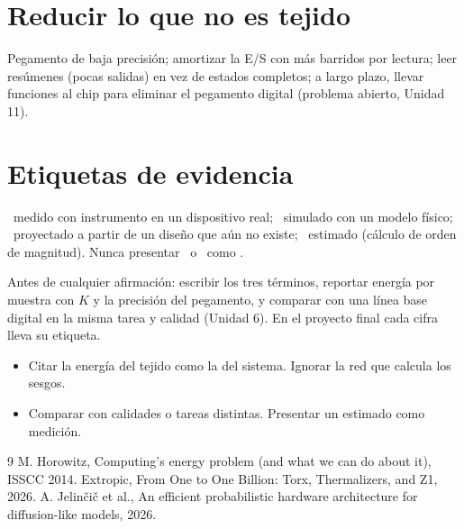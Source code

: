 \documentclass[11pt,a4paper]{article}
\begin{document}
\section{Reducir lo que no es tejido}
Pegamento de baja precisión; amortizar la E/S con más barridos por lectura; leer resúmenes (pocas salidas) en vez de estados completos; a largo plazo, llevar
funciones al chip para eliminar el pegamento digital (problema abierto, Unidad 11).

\section{Etiquetas de evidencia}
\begin{definicion}[ (RA7)]
\evM\ medido con instrumento en un dispositivo real; \evS\ simulado con un modelo físico; \evP\ proyectado a partir de un diseño que aún no existe;
\evE\ estimado (cálculo de orden de magnitud). Nunca presentar \evP\ o \evE\ como \evM.
\end{definicion}

\begin{aplicacion}
Antes de cualquier afirmación: escribir los tres términos, reportar energía por muestra con $K$ y la precisión del pegamento, y comparar con una línea base digital en
la misma tarea y calidad (Unidad 6). En el proyecto final cada cifra lleva su etiqueta.
\end{aplicacion}

\begin{error}
\begin{itemize}[nosep]
\item Citar la energía del tejido como la del sistema. \quad Ignorar la red que calcula los sesgos.
\item Comparar con calidades o tareas distintas. \quad Presentar un estimado como medición.
\end{itemize}
\end{error}

\begin{thebibliography}{9}\small
{} M. Horowitz, Computing's energy problem (and what we can do about it), ISSCC 2014.
 Extropic, From One to One Billion: Torx, Thermalizers, and Z1, 2026.
 A. Jelinčič et al., An efficient probabilistic hardware architecture for diffusion-like models, 2026.
\end{thebibliography}
\end{document}
